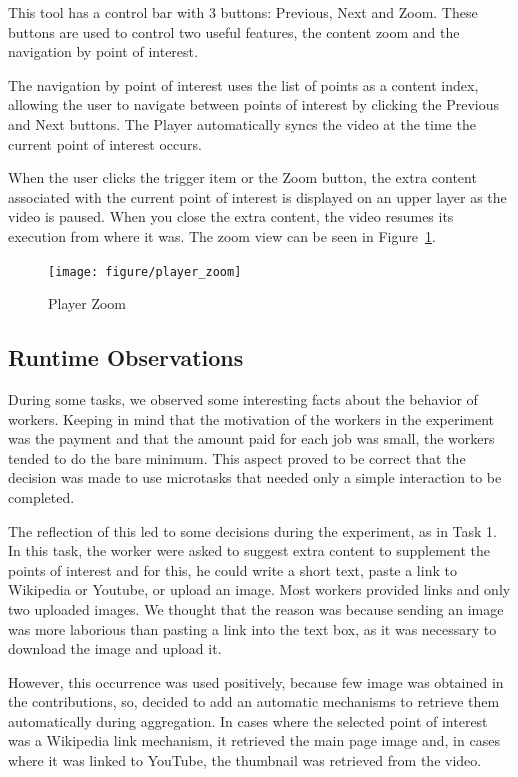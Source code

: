 This tool has a control bar with 3 buttons: Previous, Next and Zoom. These buttons are used to control two useful features, the content zoom and the navigation by point of interest.

The navigation by point of interest uses the list of points as a content index, allowing the user to navigate between points of interest by clicking the Previous and Next buttons. The Player automatically syncs the video at the time the current point of interest occurs.


When the user clicks the trigger item or the Zoom button, the extra content associated with the current point of interest is displayed on an upper layer as the video is paused. When you close the extra content, the video resumes its execution from where it was. The zoom view can be seen in Figure~\ref{player_zoom}.

\begin{figure}[h!]
	\centerline{\texttt{[image: figure/player\_zoom]}}
	\caption{Player Zoom}
	\label{player_zoom}
\end{figure}



 \subsection{Runtime Observations}
 
During some tasks, we observed some interesting facts about the behavior of workers. Keeping in mind that the motivation of the workers in the experiment was the payment and that the amount paid for each job was small, the workers tended to do the bare minimum. This aspect proved to be correct that the decision was made to use microtasks that needed only a simple interaction to be completed.
 
The reflection of this led to some decisions during the experiment, as in Task 1. In this task, the worker were asked to suggest extra content to supplement the points of interest and for this, he could write a short text, paste a link to Wikipedia or Youtube, or upload an image. Most workers provided links and only two uploaded images. We thought that the reason was because sending an image was more laborious than pasting a link into the text box, as it was necessary to download the image and upload it.

However, this occurrence was used positively, because few image was obtained in the contributions, so, decided to add an automatic mechanisms to retrieve them automatically during aggregation. In cases where the selected point of interest was a Wikipedia link mechanism, it retrieved the main page image and, in cases where it was linked to YouTube, the thumbnail was retrieved from the video.

